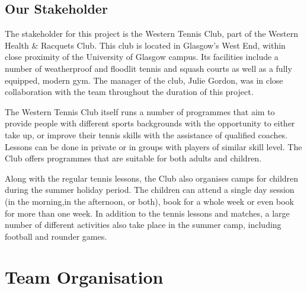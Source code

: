 \documentclass{l3proj}
\begin{document}
\section{Our Stakeholder}
\par
The stakeholder for this project is the Western Tennis Club, part of the Western Health \& Racquets Club. This club is located in Glasgow's West End, within close proximity of the University of Glasgow campus. Its facilities include a number of weatherproof and floodlit tennis and squash courts as well as a fully equipped, modern gym. The manager of the club, Julie Gordon, was in close collaboration with the team throughout the duration of this project.
\par
The Western Tennis Club itself runs a number of programmes that aim to provide people with different sports backgrounds with the opportunity to either take up, or improve their tennis skills with the assistance of qualified coaches. Lessons can be done in private or in groups with players of similar skill level. The Club offers programmes that are suitable for both adults and children.
\par
Along with the regular tennis lessons, the Club also organises camps for children during the summer holiday period. The children can attend a single day session (in the morning,in the afternoon, or both), book for a whole week or even book for more than one week. In addition to the tennis lessons and matches, a large number of different activities also take place in the summer camp, including football and rounder games.

\chapter{Team Organisation}
\label{teamorganisation}

\end{document}
